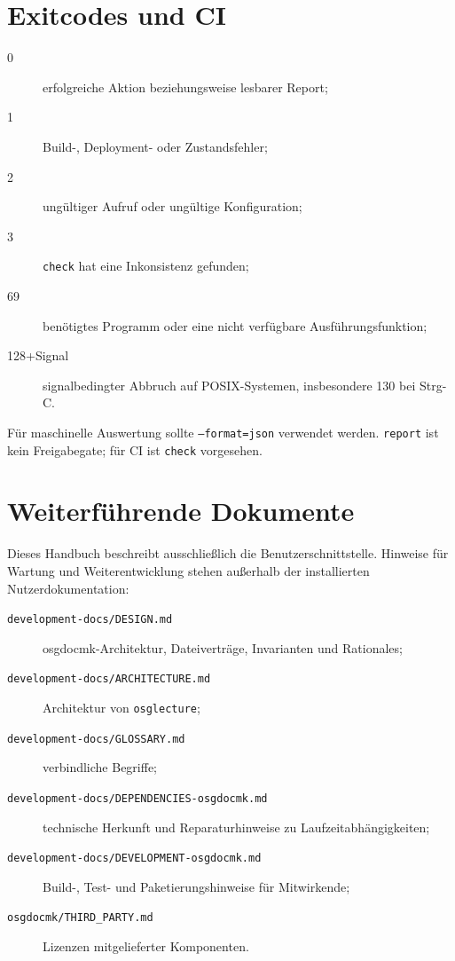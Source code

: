 \documentclass[
load-preamble+
]{osgdoc}
\begin{document}
\section{Exitcodes und CI}

\begin{description}
\item[0] erfolgreiche Aktion beziehungsweise lesbarer Report;
\item[1] Build-, Deployment- oder Zustandsfehler;
\item[2] ungültiger Aufruf oder ungültige Konfiguration;
\item[3] \texttt{check} hat eine Inkonsistenz gefunden;
\item[69] benötigtes Programm oder eine nicht verfügbare Ausführungsfunktion;
\item[128+Signal] signalbedingter Abbruch auf POSIX-Systemen, insbesondere
  130 bei Strg-C.
\end{description}

Für maschinelle Auswertung sollte \texttt{--format=json} verwendet werden.
\texttt{report} ist kein Freigabegate; für CI ist \texttt{check} vorgesehen.

\section{Weiterführende Dokumente}

Dieses Handbuch beschreibt ausschließlich die Benutzerschnittstelle. Hinweise
für Wartung und Weiterentwicklung stehen außerhalb der installierten
Nutzerdokumentation:

\begin{description}
\item[\texttt{development-docs/DESIGN.md}] osgdocmk-Architektur, Dateiverträge,
  Invarianten und Rationales;
\item[\texttt{development-docs/ARCHITECTURE.md}] Architektur von
  \texttt{osglecture};
\item[\texttt{development-docs/GLOSSARY.md}] verbindliche Begriffe;
\item[\texttt{development-docs/DEPENDENCIES-osgdocmk.md}] technische Herkunft
  und Reparaturhinweise zu Laufzeitabhängigkeiten;
\item[\texttt{development-docs/DEVELOPMENT-osgdocmk.md}] Build-, Test- und
  Paketierungshinweise für Mitwirkende;
\item[\texttt{osgdocmk/THIRD\_PARTY.md}] Lizenzen mitgelieferter Komponenten.
\end{description}
\end{document}
